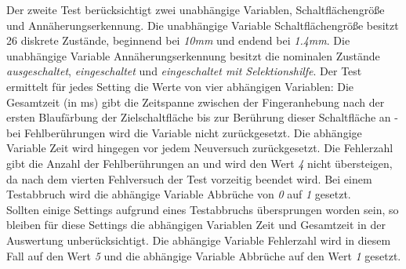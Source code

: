 \documentclass[12pt,numbers=noenddot,parskip,bibliography=totocnumbered,listof=totocnumbered]{scrreprt}
\begin{document}
Der zweite Test berücksichtigt zwei unabhängige Variablen, {\ttfamily Schaltflächengröße} und {\ttfamily Annäherungserkennung}. Die unabhängige Variable {\ttfamily Schaltflächengröße} besitzt 26 diskrete Zustände, beginnend bei \emph{10mm} und endend bei \emph{1.4mm}. Die unabhängige Variable {\ttfamily Annäherungserkennung} besitzt die nominalen Zustände \emph{ausgeschaltet}, \emph{eingeschaltet} und \emph{eingeschaltet mit Selektionshilfe}. Der Test ermittelt für jedes Setting die Werte von vier abhängigen Variablen: Die {\ttfamily Gesamtzeit} (in ms) gibt die Zeitspanne zwischen der Fingeranhebung nach der ersten Blaufärbung der Zielschaltfläche bis zur Berührung dieser Schaltfläche an - bei Fehlberührungen wird die Variable nicht zurückgesetzt. Die abhängige Variable {\ttfamily Zeit} wird hingegen vor jedem Neuversuch zurückgesetzt. Die {\ttfamily Fehlerzahl} gibt die Anzahl der Fehlberührungen an und wird den Wert \emph{4} nicht übersteigen, da nach dem vierten Fehlversuch der Test vorzeitig beendet wird. Bei einem Testabbruch wird die abhängige Variable {\ttfamily Abbrüche} von \emph{0} auf \emph{1} gesetzt.\\
Sollten einige Settings aufgrund eines Testabbruchs übersprungen worden sein, so bleiben für diese Settings die abhängigen Variablen {\ttfamily Zeit} und {\ttfamily Gesamtzeit} in der Auswertung unberücksichtigt. Die abhängige Variable {\ttfamily Fehlerzahl} wird in diesem Fall auf den Wert \emph{5} und die abhängige Variable {\ttfamily Abbrüche} auf den Wert \emph{1} gesetzt.
\end{document}
